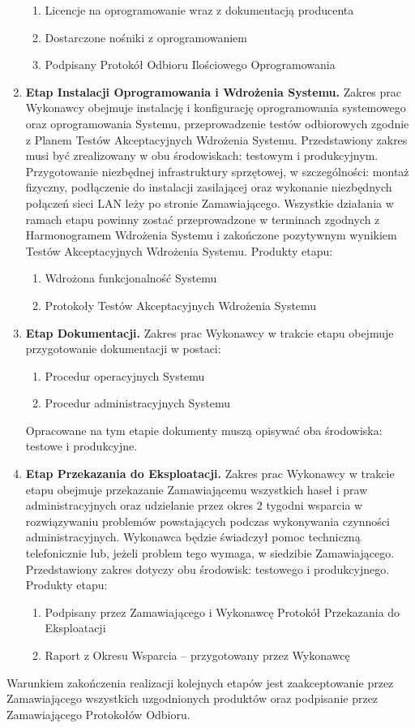 \documentclass{article}
\begin{document}
\begin{enumerate}
\begin{enumerate}
\item Licencje na oprogramowanie wraz z dokumentacją producenta
\item Dostarczone nośniki z oprogramowaniem
\item Podpisany Protokół Odbioru Ilościowego Oprogramowania
\end{enumerate}
\item \textbf{Etap Instalacji Oprogramowania i Wdrożenia Systemu.}
Zakres prac Wykonawcy obejmuje instalację i konfigurację oprogramowania systemowego oraz oprogramowania Systemu, przeprowadzenie testów odbiorowych zgodnie z Planem Testów Akceptacyjnych Wdrożenia Systemu. Przedstawiony zakres musi być zrealizowany w obu środowiskach: testowym i produkcyjnym. Przygotowanie niezbędnej infrastruktury sprzętowej, w szczególności: montaż fizyczny, podłączenie do instalacji zasilającej oraz wykonanie niezbędnych połączeń sieci LAN leży po stronie Zamawiającego. Wszystkie działania w ramach etapu powinny zostać przeprowadzone w terminach zgodnych z Harmonogramem Wdrożenia Systemu i zakończone pozytywnym wynikiem Testów Akceptacyjnych Wdrożenia Systemu. Produkty etapu:
\begin{enumerate}
\item Wdrożona funkcjonalność Systemu
\item Protokoły Testów Akceptacyjnych Wdrożenia Systemu
\end{enumerate}
\item \textbf{Etap Dokumentacji.} Zakres prac Wykonawcy w trakcie etapu obejmuje przygotowanie dokumentacji w postaci:
\begin{enumerate}
\item Procedur operacyjnych Systemu
\item Procedur administracyjnych Systemu
\end{enumerate}
Opracowane na tym etapie dokumenty muszą opisywać oba środowiska: testowe i produkcyjne.
\item \textbf{Etap Przekazania do Eksploatacji.} Zakres prac Wykonawcy w trakcie etapu obejmuje przekazanie Zamawiającemu wszystkich haseł i praw administracyjnych oraz udzielanie przez okres 2 tygodni wsparcia w rozwiązywaniu problemów powstających podczas wykonywania czynności administracyjnych. Wykonawca będzie świadczył pomoc techniczną telefonicznie lub, jeżeli problem tego wymaga, w siedzibie Zamawiającego. Przedstawiony zakres dotyczy obu środowisk: testowego i produkcyjnego. Produkty etapu:
\begin{enumerate}
\item Podpisany przez Zamawiającego i Wykonawcę Protokół Przekazania do Eksploatacji
\item Raport z Okresu Wsparcia  – przygotowany przez Wykonawcę
\end{enumerate}
\end{enumerate}
Warunkiem zakończenia realizacji kolejnych etapów jest zaakceptowanie przez Zamawiającego wszystkich uzgodnionych produktów oraz podpisanie przez Zamawiającego Protokołów Odbioru.
\end{document}
